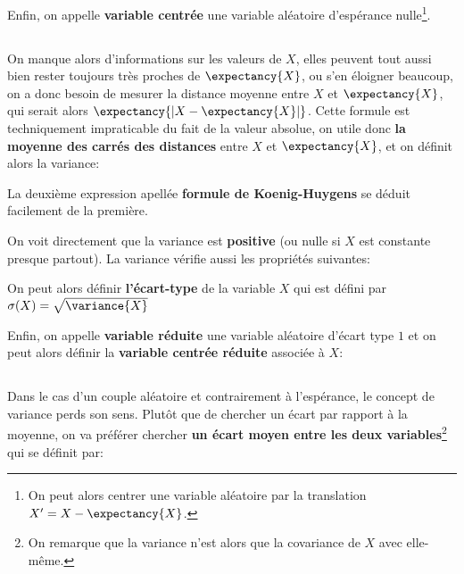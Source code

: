 Enfin, on appelle \textbf{variable centrée} une variable aléatoire d'espérance nulle\footnote[2]{On peut alors centrer une variable aléatoire par la translation \(X' = X - \expectancy{X}\).}.

\subsection*{}
On manque alors d'informations sur les valeurs de \(X\), elles peuvent tout aussi bien rester toujours très
proches de \(\expectancy{X}\), ou s'en éloigner beaucoup, on a donc besoin de mesurer la distance moyenne entre \(X\) et \(\expectancy{X}\), qui serait alors \(\expectancy{| X - \expectancy{X} |}\).\+
Cette formule est techniquement impraticable du fait de la valeur absolue, on utile donc \textbf{la moyenne des carrés des distances} entre \(X\) et \(\expectancy{X}\), et on définit alors la variance:

La deuxième expression apellée \textbf{formule de Koenig-Huygens} se déduit facilement de la première.
\pagebreak

On voit directement que la variance est \textbf{positive} (ou nulle si \(X\) est constante presque partout). \+
La variance vérifie aussi les propriétés suivantes:

On peut alors définir \textbf{l'écart-type} de la variable \(X\) qui est défini par \(\sigma(X) = \sqrt{\variance{X}}\)\<

Enfin, on appelle \textbf{variable réduite} une variable aléatoire d'écart type \(1\) et on peut alors définir la \textbf{variable centrée réduite} associée à \(X\):


\subsection*{}
Dans le cas d'un couple aléatoire et contrairement à l'espérance, le concept de variance perds son sens. Plutôt que de chercher un écart par rapport à la moyenne, on va préférer chercher \textbf{un écart moyen entre les deux variables}\footnote[1]{On remarque que la variance n'est alors que la covariance de \(X\) avec elle-même.} qui se définit par:

